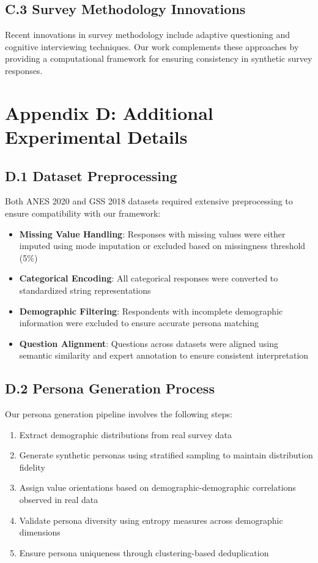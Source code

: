 \documentclass[sigconf, anonymous]{acmart}
\begin{document}
\subsection*{C.3 Survey Methodology Innovations}

Recent innovations in survey methodology include adaptive questioning and cognitive interviewing techniques. Our work complements these approaches by providing a computational framework for ensuring consistency in synthetic survey responses.

\newpage
\section*{Appendix D: Additional Experimental Details}

\subsection*{D.1 Dataset Preprocessing}

Both ANES 2020 and GSS 2018 datasets required extensive preprocessing to ensure compatibility with our framework:

\begin{itemize}
    \item \textbf{Missing Value Handling}: Responses with missing values were either imputed using mode imputation or excluded based on missingness threshold (5\%)
    \item \textbf{Categorical Encoding}: All categorical responses were converted to standardized string representations
    \item \textbf{Demographic Filtering}: Respondents with incomplete demographic information were excluded to ensure accurate persona matching
    \item \textbf{Question Alignment}: Questions across datasets were aligned using semantic similarity and expert annotation to ensure consistent interpretation
\end{itemize}

\subsection*{D.2 Persona Generation Process}

Our persona generation pipeline involves the following steps:

\begin{enumerate}
    \item Extract demographic distributions from real survey data
    \item Generate synthetic personas using stratified sampling to maintain distribution fidelity
    \item Assign value orientations based on demographic-demographic correlations observed in real data
    \item Validate persona diversity using entropy measures across demographic dimensions
    \item Ensure persona uniqueness through clustering-based deduplication
\end{enumerate}
\end{document}
